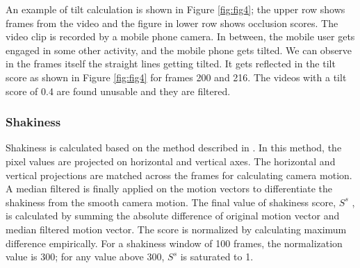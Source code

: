 \documentclass{sig-alternate}
\begin{document}
An example of tilt calculation is shown in Figure \ref{fig:fig4}; the upper row shows frames from the video and the figure in lower row shows occlusion scores. The video clip is recorded by a mobile phone camera. In between, the mobile user gets engaged in some other activity, and the mobile phone gets tilted. We can observe in the frames itself the straight lines getting tilted. It gets reflected in the tilt score as shown in Figure \ref{fig:fig4} for frames 200 and 216. The videos
with a tilt score of 0.4 are found unusable and they are filtered.

\subsubsection{Shakiness}
Shakiness is calculated based on the method described in \cite{4}. In this method, the pixel values are projected on horizontal and vertical axes. The horizontal and vertical projections are matched across the frames for calculating camera motion. A median filtered is finally applied on the motion vectors to differentiate the shakiness from the smooth camera motion. The final value of shakiness score, $S^s$ , is calculated by summing the absolute difference of original motion vector and median filtered motion vector. The score is normalized by calculating maximum difference empirically. For a shakiness window of 100 frames, the normalization value is 300; for any value above 300, $S^s$ is saturated to 1.
\end{document}
